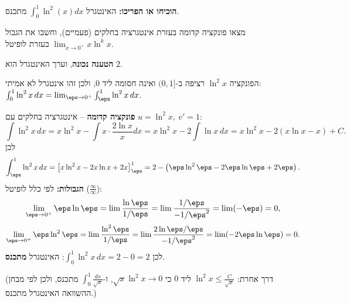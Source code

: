 
\begin{question}
\textbf{הוכיחו או הפריכו:} האינטגרל $\int_0^1\ln^2(x)dx$ מתכנס.
\end{question}

\begin{hint}
מצאו פונקציה קדומה בעזרת אינטגרציה בחלקים (פעמיים), וחשבו את הגבול $\lim_{x\to0^+}x\ln^k x$ בעזרת לופיטל.
\end{hint}

\begin{solution}
\textbf{הטענה נכונה}, וערך האינטגרל הוא $2$.

הפונקציה $\ln^2x$ רציפה ב-$(0,1]$ ואינה חסומה ליד $0$, ולכן זהו אינטגרל לא אמיתי: $\int_0^1\ln^2x\,dx=\lim_{\eps\to0^+}\int_\eps^1\ln^2x\,dx$.

\textbf{פונקציה קדומה} -- אינטגרציה בחלקים עם $u=\ln^2x,\ v'=1$:
\[ \int\ln^2x\,dx=x\ln^2x-\int x\cdot\frac{2\ln x}{x}dx=x\ln^2x-2\int\ln x\,dx=x\ln^2x-2(x\ln x-x)+C. \]
לכן
\[ \int_\eps^1\ln^2x\,dx=\big[x\ln^2x-2x\ln x+2x\big]_\eps^1=2-\left(\eps\ln^2\eps-2\eps\ln\eps+2\eps\right). \]
\textbf{הגבולות:} לפי כלל לופיטל ($\frac{\infty}{\infty}$):
\[ \lim_{\eps\to0^+}\eps\ln\eps=\lim\frac{\ln\eps}{1/\eps}=\lim\frac{1/\eps}{-1/\eps^2}=\lim(-\eps)=0, \]
\[ \lim_{\eps\to0^+}\eps\ln^2\eps=\lim\frac{\ln^2\eps}{1/\eps}=\lim\frac{2\ln\eps/\eps}{-1/\eps^2}=\lim(-2\eps\ln\eps)=0. \]
לכן $\int_0^1\ln^2x\,dx=2-0=2$: האינטגרל \textbf{מתכנס}.

(דרך אחרת: $\ln^2x\le\frac{C}{\sqrt x}$ ליד $0$ כי $\sqrt x\ln^2x\to0$, ו-$\int_0^1\frac{dx}{\sqrt x}$ מתכנס, ולכן לפי מבחן ההשוואה האינטגרל מתכנס.)
\end{solution}

